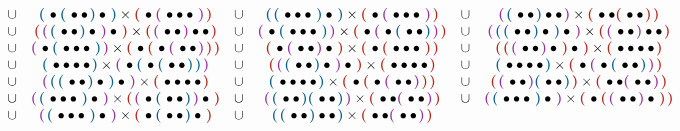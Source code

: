 \documentclass[twoside, 12pt]{amsart}
\theoremstyle{remark}
\begin{document}
{\begin{minipage}{\linewidth}
\begin{align*}
\begin{matrix}
      & \cup & \blue{\bullet \blue{\bullet \bullet} \bullet} \times \red{\bullet \purple{\bullet\bullet \bullet}}
      & \cup & \blue{\blue{\bullet \bullet \bullet}\bullet} \times \red{\bullet \purple{\bullet \bullet \bullet}}
      & \cup & \purple{\blue{\bullet \bullet}\bullet \bullet} \times \red{\bullet \bullet\red{\bullet \bullet}} \\
      & \cup & \red{\purple{\blue{\bullet \bullet}\bullet}\bullet} \times \red{\purple{\bullet \bullet}\bullet \bullet}
      & \cup & \purple{\bullet \blue{\bullet \bullet \bullet}} \times \red{\bullet \purple{\bullet \blue{\bullet \bullet}}}
      & \cup & \purple{\blue{\blue{\bullet \bullet}\bullet}\bullet} \times \red{\purple{\bullet \bullet}\bullet \bullet} \\
      & \cup & \purple{\bullet \blue{\bullet \bullet \bullet}} \times \red{\bullet \red{ \bullet \purple{\bullet \bullet}}} 
      & \cup & \red{\bullet \purple{\bullet \bullet}\bullet} \times \red{\bullet \red{\bullet \bullet \bullet}}
      & \cup & \red{\red{\purple{\bullet \bullet}\bullet }\bullet} \times \red{\bullet \bullet \bullet \bullet} \\
      & \cup & \blue{\bullet \bullet \bullet \bullet} \times \purple{\bullet \blue{\bullet\blue{\bullet \bullet}}} 
      & \cup &   \red{\purple{\blue{\bullet \bullet}\bullet}\bullet} \times \red{\bullet \bullet \bullet \bullet} 
      & \cup & \blue{\bullet \bullet \bullet \bullet} \times \red{\bullet \purple{\bullet \blue{\bullet \bullet}}} \\
      & \cup & \purple{\blue{\blue{\bullet \bullet}\bullet}\bullet} \times \red{\bullet \bullet \bullet \bullet} 
      & \cup & \blue{\bullet \bullet \bullet \bullet} \times \red{\bullet\red{\bullet\purple{\bullet \bullet}}} 
      & \cup & \red{\purple{\bullet \bullet}\blue{\bullet \bullet}} \times \red{\bullet \bullet \purple{\bullet \bullet}} \\
      & \cup & \purple{\blue{\bullet \bullet \bullet}\bullet} \times \red{\purple{\bullet \blue{\bullet \bullet}}\bullet}
      & \cup & \purple{\blue{\bullet \bullet}\blue{\bullet \bullet}} \times \red{\bullet \bullet \purple{\bullet \bullet}}
      & \cup & \purple{\blue{\bullet \bullet \bullet}\bullet} \times \red{\bullet \red{\purple{\bullet \bullet}\bullet}} \\ %
      & \cup & \purple{\blue{\bullet \bullet \bullet}\bullet} \times \red{\bullet \blue{\bullet \bullet}\bullet} %
      & \cup & \blue{\blue{\bullet \bullet}\bullet \bullet} \times \red{\bullet \bullet\purple{\bullet \bullet}}

\end{matrix}
\end{align*}
\end{minipage}}
\end{document}
